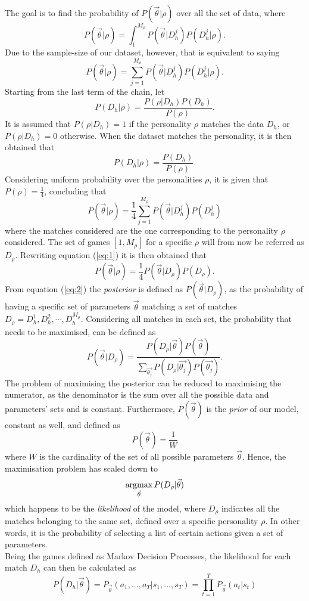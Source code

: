The goal is to find the probability of $P(\vec{\theta}|\rho)$ over all the set of data, where $$P(\vec{\theta}|\rho) = \int_{1}^{M_\rho} P(\vec{\theta}|D_h^j)P(D_h^j|\rho).$$ Due to the sample-size of our dataset, however, that is equivalent to saying $$P(\vec{\theta}|\rho) = \sum_{j=1}^{M_\rho} P(\vec{\theta}|D_h^j)P(D_h^j|\rho).$$ Starting from the last term of the chain, let $$P(D_h|\rho) = \frac{P(\rho | D_h)P(D_h)}{P(\rho)}.$$ It is assumed that $P(\rho|D_h)=1$ if the personality $\rho$ matches the data $D_h$, or  $P(\rho|D_h)=0$ otherwise. When the dataset matches the personality, it is then obtained that $$P(D_h|\rho) = \frac{P(D_h)}{P(\rho)}.$$ Considering uniform probability over the personalities $\rho$, it is given that $P(\rho)=\frac{1}{4}$, concluding that 
\begin{equation}\label{eq:1}
P(\vec{\theta}|\rho) = \frac{1}{4}\sum_{j=1}^{M_\rho} P(\vec{\theta}|D_h^j)P(D_h^j)
\end{equation} where the matches considered are the one corresponding to the personality $\rho$ considered. The set of games $[1,M_\rho]$ for a specific $\rho$ will from now be referred as $D_\rho$. Rewriting equation (\ref{eq:1}) it is then obtained that \begin{equation}\label{eq:2}
P(\vec{\theta}|\rho) = \frac{1}{4}P(\vec{\theta}|D_\rho)P(D_\rho).
\end{equation}
From equation (\ref{eq:2}) the \emph{posterior} is defined as $P(\vec{\theta}|D_\rho)$, as the probability of having a specific set of parameters $\vec{\theta}$ matching a set of matches $D_\rho={D_h^1,D_h^2,\cdots,D_h^{M_\rho}}$. 
Considering all matches in each set, the probability that needs to be maximised, can be defined as $$P(\vec{\theta}|D_\rho) = \frac{P(D_\rho|\vec{\theta})P(\vec{\theta})}{\sum_{\vec{\theta_j}} P(D_\rho|\vec{\theta_j})P(\vec{\theta_j})}.$$
The problem of maximising the posterior can be reduced to maximising the numerator, as the denominator is the sum over all the possible data and parameters' sets and is constant. Furthermore, $P(\vec{\theta})$ is the \emph{prior} of our model, constant as well, and defined as $$P(\vec{\theta})=\frac{1}{W}$$ where $W$ is the cardinality of the set of all possible parameters $\vec{\theta}$.
Hence, the maximisation problem has scaled down to \begin{equation}\label{eq:argmax}
	\operatorname*{\arg\!\max}_{\vec{\theta}} P(D_\rho|\vec{\theta})
\end{equation} which happens to be the \emph{likelihood} of the model, where $D_\rho$ indicates all the matches belonging to the same set, defined over a specific personality $\rho$. In other words, it is the probability of selecting a list of certain actions given a set of parameters.\\ Being the games defined as Markov Decision Processes, the likelihood for each match $D_h$ can then be calculated as \begin{equation}\label{eq:likelihood}
P(D_h|{\vec{\theta}}) = P_{\vec{\theta}}(a_1,...,a_T| s_1,...,s_T) = \prod_{t=1}^{T} P_{\vec{\theta}}(a_t|s_t)
\end{equation}
